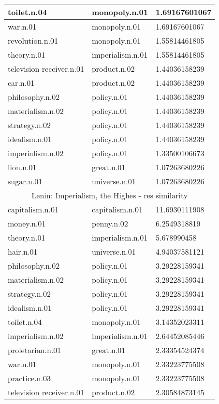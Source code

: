 \begin{center}
\begin{tabular}{ | l | l | l |}
toilet.n.04 & monopoly.n.01 & 1.69167601067 \\ \hline
war.n.01 & monopoly.n.01 & 1.69167601067 \\ \hline
revolution.n.01 & monopoly.n.01 & 1.55814461805 \\ \hline
theory.n.01 & imperialism.n.01 & 1.55814461805 \\ \hline
television receiver.n.01 & product.n.02 & 1.44036158239 \\ \hline
car.n.01 & product.n.02 & 1.44036158239 \\ \hline
philosophy.n.02 & policy.n.01 & 1.44036158239 \\ \hline
materialism.n.02 & policy.n.01 & 1.44036158239 \\ \hline
strategy.n.02 & policy.n.01 & 1.44036158239 \\ \hline
idealism.n.01 & policy.n.01 & 1.44036158239 \\ \hline
imperialism.n.02 & policy.n.01 & 1.33500106673 \\ \hline
lion.n.01 & great.n.01 & 1.07263680226 \\ \hline
sugar.n.01 & universe.n.01 & 1.07263680226 \\ \hline
\multicolumn{3}{|c|}{Lenin: Imperialism, the Highes - res similarity} \\ \hline
capitalism.n.01 & capitalism.n.01 & 11.6930111908 \\ \hline
money.n.01 & penny.n.02 & 6.2549318819 \\ \hline
theory.n.01 & imperialism.n.01 & 5.678990458 \\ \hline
hair.n.01 & universe.n.01 & 4.94037581121 \\ \hline
philosophy.n.02 & policy.n.01 & 3.29228159341 \\ \hline
materialism.n.02 & policy.n.01 & 3.29228159341 \\ \hline
strategy.n.02 & policy.n.01 & 3.29228159341 \\ \hline
idealism.n.01 & policy.n.01 & 3.29228159341 \\ \hline
toilet.n.04 & monopoly.n.01 & 3.14352023311 \\ \hline
imperialism.n.02 & imperialism.n.01 & 2.64452085446 \\ \hline
proletarian.n.01 & great.n.01 & 2.33354524374 \\ \hline
war.n.01 & monopoly.n.01 & 2.33223775508 \\ \hline
practice.n.03 & monopoly.n.01 & 2.33223775508 \\ \hline
television receiver.n.01 & product.n.02 & 2.30584873145 \\ \hline

\end{tabular}
\end{center}
